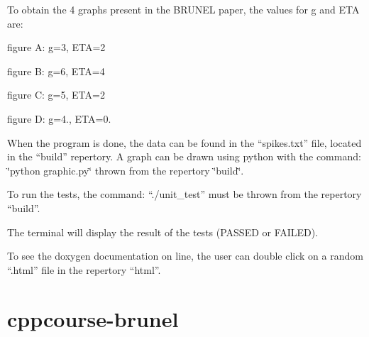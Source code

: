 To obtain the 4 graphs present in the B\-R\-U\-N\-E\-L paper, the values for g and E\-T\-A are\-:
\begin{DoxyItemize}
\item figure A\-: g=3, E\-T\-A=2
\item figure B\-: g=6, E\-T\-A=4
\item figure C\-: g=5, E\-T\-A=2
\item figure D\-: g=4., E\-T\-A=0.
\end{DoxyItemize}

When the program is done, the data can be found in the “spikes.\-txt” file, located in the “build” repertory. A graph can be drawn using python with the command\-: \char`\"{}python graphic.\-py\char`\"{} thrown from the repertory \char`\"{}build\char`\"{}.


\begin{DoxyItemize}
\item To run the tests, the command\-: “./unit\-\_\-test” must be thrown from the repertory “build”.
\end{DoxyItemize}

The terminal will display the result of the tests (P\-A\-S\-S\-E\-D or F\-A\-I\-L\-E\-D).


\begin{DoxyItemize}
\item To see the doxygen documentation on line, the user can double click on a random “.\-html” file in the repertory “html”. \section*{cppcourse-\/brunel}
\end{DoxyItemize}